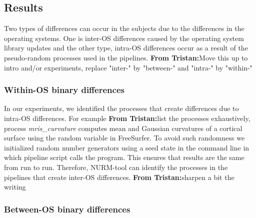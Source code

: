 \documentclass[a4paper,num-refs]{oup-contemporary}
\newcommand{\tristan}[1]{\color{blue}\textbf{From Tristan:}#1\color{black}}
\begin{document}
\subsection{Results}

Two types of differences can occur in the subjects due to the differences
in the operating systems. One is inter-OS differences caused by the
operating system library updates and the other type, intra-OS differences
occur as a result of the pseudo-random processes used in the pipelines.
\tristan{Move this up to intro and/or experiments, replace "inter-" by
"between-" and "intra-" by "within-"}

\subsubsection{Within-OS binary differences}

In our experiments, we identified the processes that create differences due to 
intra-OS differences.  
For example \tristan{list the processes exhaustively}, process \emph{mris\_curvature}
computes mean and Gaussian curvatures of a cortical surface using 
the random variable in FreeSurfer.
To avoid such randomness we 
initialized random number generators using a seed state in 
the command line in which pipeline script calls the program.
This ensures that results are the same from run to run.
Therefore, NURM-tool can identify the processes in the pipelines 
that create inter-OS differences. \tristan{sharpen a bit the writing}

\subsubsection{Between-OS binary differences}
\end{document}
